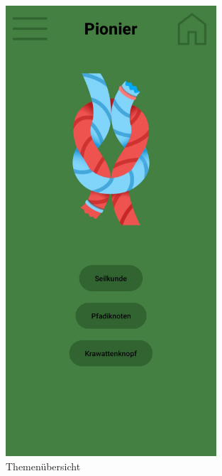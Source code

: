 \begin{figure}[!hp]
    \begin{minipage}[b]{0.4\textwidth}
        \centering
        \includegraphics[width=0.7\textwidth]{Picture/themen_uebersicht.jpg}
        \caption{Themenübersicht}
        \label{fig:themen_uebersicht}
    \end{minipage}
    \begin{minipage}[b]{0.4\textwidth}
        \centering

\end{minipage}
\end{figure}
